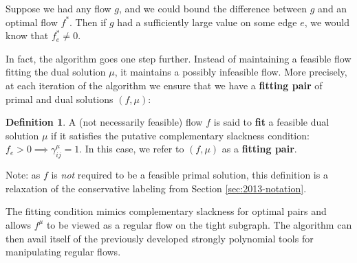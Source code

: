 \documentclass[11pt]{article}
\theoremstyle{definition}
\newtheorem{definition}{Definition}[section]
\theoremstyle{definition}
\theoremstyle{definition}
\newcommand{\giij}{\gamma_{ij}^{\mu}}
\begin{document}
	Suppose we had any flow $g$, and we could bound the difference between $g$ and an optimal
	flow $f^*$. Then if $g$ had a sufficiently large value on some edge $e$, we would know that
	$f^*_e \neq 0$.
    
	In fact, the algorithm goes one step further. Instead of maintaining a feasible flow
	fitting the dual solution $\mu$, it maintains a possibly infeasible flow. More precisely,
    at each iteration of the algorithm we ensure that we have a \textbf{fitting pair}
	of primal and dual solutions $(f,\mu)$:
	\begin{definition}
	A (not necessarily feasible) flow $f$ is said to \textbf{fit} a feasible dual solution $\mu$
    if it satisfies the putative complementary slackness condition: $f_e > 0 \implies \giij = 1$.
    In this case, we refer to $(f, \mu)$ as a \textbf{fitting pair}.
	\end{definition}
    Note: as $f$ is \emph{not} required to be a feasible primal solution,
    this definition is a relaxation of the
	conservative labeling from Section \ref{sec:2013-notation}.
	
	The fitting condition mimics complementary
	slackness for optimal pairs and allows $f^\mu$ to be viewed as a regular flow
	on the tight subgraph. The algorithm can then avail itself of the previously developed
	strongly polynomial tools for manipulating regular flows.
    
\end{document}
